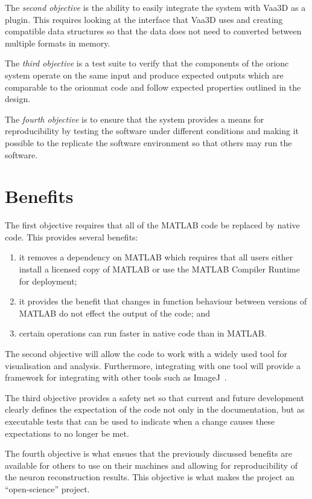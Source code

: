 The \emph{second objective} is the ability to easily integrate the system with
Vaa3D as a plugin. This requires looking at the interface that
Vaa3D uses and creating compatible data structures so that the
data does not need to converted between multiple formats in
memory.

The \emph{third objective} is a test suite to verify that the
components of the \gls{orionc} system operate on the same input
and produce expected outputs which are comparable to the
\gls{orionmat} code and follow expected properties outlined in the
design.

The \emph{fourth objective} is to ensure that the system provides
a means for reproducibility by testing the software under different
conditions and making it possible to the replicate the software
environment so that others may run the software.

\section{Benefits}

The first objective requires that all of the MATLAB code be
replaced by native code. This provides several benefits:
\begin{enumerate}[label={\alph*)}]
	\item it removes a dependency on MATLAB which requires that
		all users either install a licensed copy of MATLAB
		or use the MATLAB Compiler Runtime for deployment;
	\item it provides the benefit that changes in
		function behaviour between versions of
		MATLAB do not effect the output of the
		code; and
	\item certain operations can run faster in native code than
		in MATLAB.
\end{enumerate}

The second objective will allow the code to work with a widely used
tool for visualisation and analysis. Furthermore, integrating with
one tool will provide a framework for integrating with other tools
such as ImageJ~\autocite{Schneider2012}.

The third objective provides a safety net so that current and
future development clearly defines the expectation of the code
not only in the documentation, but as executable tests that can be
used to indicate when a change causes these expectations to no
longer be met.

The fourth objective is what ensues that the previously discussed
benefits are available for others to use on their machines and
allowing for reproducibility of the neuron reconstruction results.
This objective is what makes the project an ``open-science''
project.

